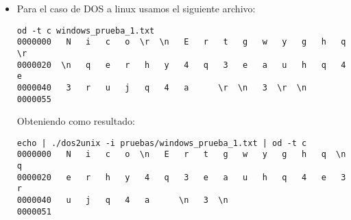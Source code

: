 \documentclass[a4paper,11pt]{article}
\begin{document}
\begin{itemize}
El resultado obtenido fue:
\begin{verbatim}
echo | ./unix2dos -i pruebas/linux_prueba_2.txt | od -t c
0000000   H  \r  \n   H  \r  \n   H  \r  \n   H  \r  \n   H  \r  \n   H
0000020  \r  \n   H  \r  \n   H  \r  \n   H  \r  \n  \r  \n  \r  \n  \r
0000040  \n  \r  \n   F  \r  \n   F  \r  \n   F  \r  \n   F  \r  \n   F
0000060  \r  \n  \r  \n   F  \r  \n   F  \r  \n   F  \r  \n   F  \r  \n
0000100  \r  \n   F  \r  \n   F  \r  \n   F  \r  \n   F  \r  \n   F  \r
0000120  \n   F  \r  \n  \r  \n   J  \r  \n   J  \r  \n   J  \r  \n   J
0000140  \r  \n   J  \r  \n   J  \r  \n   J  \r  \n   J  \r  \n   J  \r
0000160  \n   K  \r  \n   K  \r  \n   K  \r  \n   K  \r  \n  \r  \n   C
0000200  \r  \n   F  \r  \n   K  \r  \n  \r  \n  \r  \n  \r  \n  \r  \n
0000220   O   P   O   P   O   P   O   P   O   P  \r  \n   O   P   O   P
0000240   O   P   O   P   O   P  \r  \n  \r  \n   O   P   O   P   O   P
0000260   O   P   O   P  \r  \n   O   P   O   P   O   P   O   P   O   P
0000300  \r  \n  \r  \n   J  \r  \n  \r  \n  \r  \n
0000313
\end{verbatim}

\item Para el caso de DOS a linux usamos el siguiente archivo:
\begin{verbatim}
od -t c windows_prueba_1.txt 
0000000   N   i   c   o  \r  \n   E   r   t   g   w   y   g   h   q  \r
0000020  \n   q   e   r   h   y   4   q   3   e   a   u   h   q   4   e
0000040   3   r   u   j   q   4   a      \r  \n   3  \r  \n
0000055
\end{verbatim}

Obteniendo como resultado:
\begin{verbatim}
echo | ./dos2unix -i pruebas/windows_prueba_1.txt | od -t c
0000000   N   i   c   o  \n   E   r   t   g   w   y   g   h   q  \n   q
0000020   e   r   h   y   4   q   3   e   a   u   h   q   4   e   3   r
0000040   u   j   q   4   a      \n   3  \n
0000051
\end{verbatim}


\end{itemize}
\end{document}

